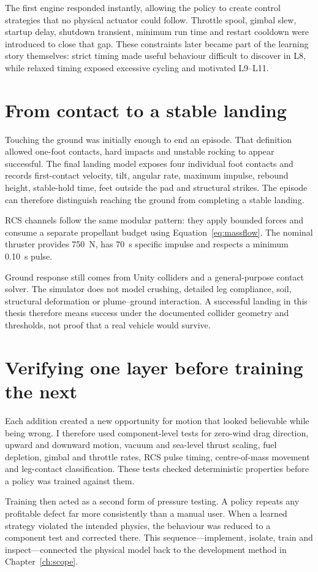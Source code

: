 The first engine responded instantly, allowing the policy to create control strategies that no
physical actuator could follow. Throttle spool, gimbal slew, startup delay, shutdown transient,
minimum run time and restart cooldown were introduced to close that gap. These constraints later
became part of the learning story themselves: strict timing made useful behaviour difficult to
discover in L8, while relaxed timing exposed excessive cycling and motivated L9--L11.

\section{From contact to a stable landing}

Touching the ground was initially enough to end an episode. That definition allowed one-foot
contacts, hard impacts and unstable rocking to appear successful. The final landing model exposes
four individual foot contacts and records first-contact velocity, tilt, angular rate, maximum
impulse, rebound height, stable-hold time, feet outside the pad and structural strikes. The
episode can therefore distinguish reaching the ground from completing a stable landing.

RCS channels follow the same modular pattern: they apply bounded forces and consume a separate
propellant budget using Equation~\eqref{eq:massflow}. The nominal thruster provides
\SI{750}{N}, has \SI{70}{s} specific impulse and respects a minimum \SI{0.10}{s} pulse.

Ground response still comes from Unity colliders and a general-purpose contact solver. The
simulator does not model crushing, detailed leg compliance, soil, structural deformation or
plume--ground interaction. A successful landing in this thesis therefore means success under
the documented collider geometry and thresholds, not proof that a real vehicle would survive.

\section{Verifying one layer before training the next}

Each addition created a new opportunity for motion that looked believable while being wrong. I
therefore used component-level tests for zero-wind drag direction, upward and downward motion,
vacuum and sea-level thrust scaling, fuel depletion, gimbal and throttle rates, RCS pulse timing,
centre-of-mass movement and leg-contact classification. These tests checked deterministic
properties before a policy was trained against them.

Training then acted as a second form of pressure testing. A policy repeats any profitable defect
far more consistently than a manual user. When a learned strategy violated the intended physics,
the behaviour was reduced to a component test and corrected there. This sequence---implement,
isolate, train and inspect---connected the physical model back to the development method in
Chapter~\ref{ch:scope}.
